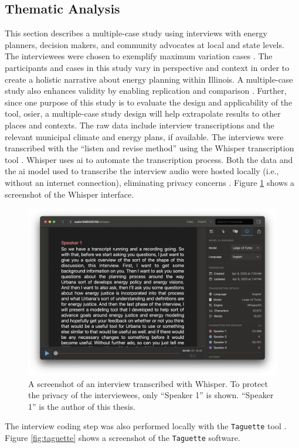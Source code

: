 \subsection{Thematic Analysis}
This section describes a multiple-case study using interviews with energy
planners, decision makers, and community advocates at local and state levels.
The interviewees were chosen to exemplify maximum variation cases
\cite{flyvbjerg_five_2006}. The participants and cases in this study
vary in perspective and context in order to create a holistic narrative about
energy planning within Illinois. A multiple-case study also enhances validity by
enabling replication and comparison \cite{johannsen_designing_2021, yin_case_2018}. Further,
since one purpose of this study is to evaluate the design and applicability of the tool, 
\ac{osier}, a multiple-case study design will help extrapolate results to other places and 
contexts. The
raw data include interview transcriptions and the relevant municipal climate and
energy plans, if available. The interviews were transcribed with the ``listen
and revise method'' using the Whisper transcription tool
\cite{battaglia_listen_2024}. Whisper uses \ac{ai} to automate the transcription
process. Both the data and the \ac{ai} model used to transcribe the interview
audio were hosted locally (i.e., without an internet connection), eliminating
privacy concerns \cite{battaglia_listen_2024}. Figure \ref{fig:whisper} shows a
screenshot of the Whisper interface. 

\begin{figure}[htbp!]
    \centering
    \includegraphics[width=0.6\columnwidth]{figures/07_interview_chapter/whisper-screenshot.png}
    \caption{A screenshot of an interview transcribed with Whisper. To protect
    the privacy of the interviewees, only ``Speaker 1'' is shown. ``Speaker 1''
    is the author of this thesis.}
    \label{fig:whisper}
\end{figure}


The interview coding step was also performed locally with the \texttt{Taguette}
tool \cite{rampin_taguette_2021}. Figure \ref{fig:taguette} shows a screenshot
of the \texttt{Taguette} software.

